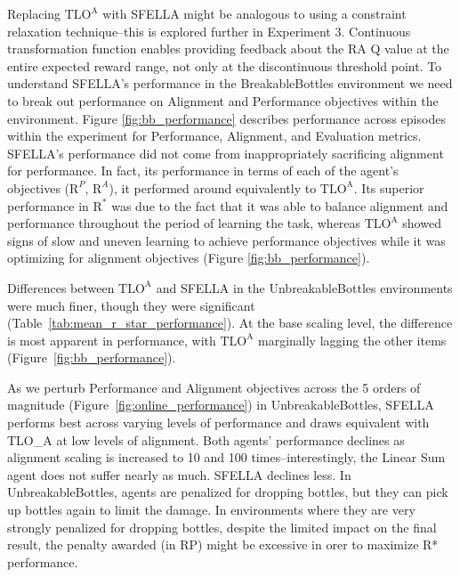 Replacing $\text{TLO}^\text{A}$ with SFELLA might be analogous to using a constraint relaxation technique--this is explored further in Experiment 3. %
Continuous transformation function enables providing feedback about the RA Q value at the entire expected reward range, not only at the discontinuous threshold point.
To understand SFELLA's performance in the BreakableBottles environment we need to break out performance on Alignment and Performance objectives within the environment. Figure \ref{fig:bb_performance} describes performance across episodes within the experiment for Performance, Alignment, and Evaluation metrics. SFELLA's performance did not come from inappropriately sacrificing alignment for performance. In fact, its performance in terms of each of the agent's objectives ($\text{R}^P$, $\text{R}^A$), it performed around equivalently to $\text{TLO}^\text{A}$. Its superior performance in $\text{R}^*$ was due to the fact that it was able to balance alignment and performance throughout the period of learning the task, whereas $\text{TLO}^\text{A}$ showed signs of slow and uneven learning to achieve performance objectives while it was optimizing for alignment objectives (Figure \ref{fig:bb_performance}).

Differences between $\text{TLO}^\text{A}$ and SFELLA in the UnbreakableBottles environments were much finer, though they were significant (Table~\ref{tab:mean_r_star_performance}). At the base scaling level, the difference is most apparent in performance, with $\text{TLO}^\text{A}$ marginally lagging the other items (Figure~\ref{fig:bb_performance}). 

As we perturb Performance and Alignment objectives across the 5 orders of magnitude (Figure~\ref{fig:online_performance}) in UnbreakableBottles, SFELLA performs best across varying levels of performance and draws equivalent with TLO\_A at low levels of alignment. Both agents' performance declines as alignment scaling is increased to 10 and 100 times--interestingly, the Linear Sum agent does not suffer nearly as much. SFELLA declines less. In UnbreakableBottles, agents are penalized for dropping bottles, but they can pick up bottles again to limit the damage. In environments where they are very strongly penalized for dropping bottles, despite the limited impact on the final result, the penalty awarded (in RP) might be excessive in orer to maximize R* performance.

